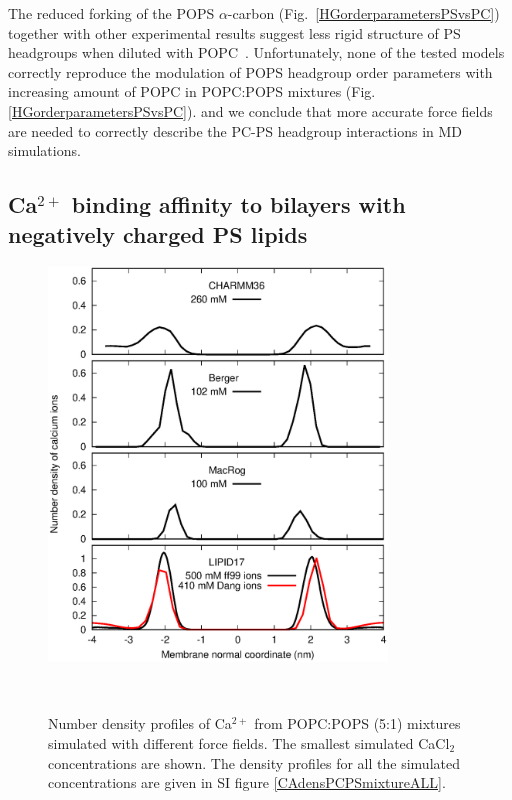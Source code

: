 \documentclass[aps,prl,superscriptaddress,twocolumn]{revtex4}
\begin{document}
The reduced forking of the POPS $\alpha$-carbon (Fig.~\ref{HGorderparametersPSvsPC})
together with other experimental results suggest less rigid structure of PS headgroups when diluted with
POPC~\cite{browning80,buldt81,roux90,roux91,scherer87}.
Unfortunately, none of the tested models correctly reproduce the modulation of POPS headgroup order
parameters with increasing amount of POPC in POPC:POPS mixtures (Fig. \ref{HGorderparametersPSvsPC}).
and we conclude that more accurate force fields are needed
to correctly describe the PC-PS headgroup interactions in MD simulations.

\subsection{Ca$^{2+}$ binding affinity to bilayers with negatively charged PS lipids}
\begin{figure}[tb]
  \centering
  \includegraphics[width=9cm]{../Figs/CAdensPCPSmixtureLOWcons.eps}
  \caption{\label{CAdensPCPSmixture}
    Number density profiles of Ca$^{2+}$ from POPC:POPS (5:1) mixtures simulated with different force fields.
    The smallest simulated CaCl$_2$ concentrations are shown.
    The density profiles for all the simulated concentrations are given in SI figure \ref{CAdensPCPSmixtureALL}.
  }
   \\
\end{figure}
\end{document}
